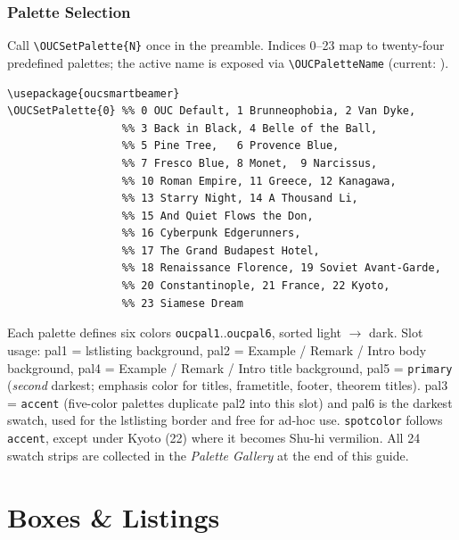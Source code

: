 \documentclass[aspectratio=169,10pt]{beamer}
\begin{document}
\begin{frame}[fragile]
    \frametitle{Palette Selection}
    Call \texttt{\textbackslash OUCSetPalette\{N\}} once in the preamble. Indices 0--23 map to twenty-four predefined palettes; the active name is exposed via \texttt{\textbackslash OUCPaletteName} (current: \OUCPaletteName).
    \begin{lstlisting}[language={[LaTeX]TeX}]
\usepackage{oucsmartbeamer}
\OUCSetPalette{0} %% 0 OUC Default, 1 Brunneophobia, 2 Van Dyke,
                  %% 3 Back in Black, 4 Belle of the Ball,
                  %% 5 Pine Tree,   6 Provence Blue,
                  %% 7 Fresco Blue, 8 Monet,  9 Narcissus,
                  %% 10 Roman Empire, 11 Greece, 12 Kanagawa,
                  %% 13 Starry Night, 14 A Thousand Li,
                  %% 15 And Quiet Flows the Don,
                  %% 16 Cyberpunk Edgerunners,
                  %% 17 The Grand Budapest Hotel,
                  %% 18 Renaissance Florence, 19 Soviet Avant-Garde,
                  %% 20 Constantinople, 21 France, 22 Kyoto,
                  %% 23 Siamese Dream
    \end{lstlisting}
    \begin{infobox}
        Each palette defines six colors \texttt{oucpal1}..\texttt{oucpal6}, sorted light $\rightarrow$ dark. Slot usage: pal1 = lstlisting background, pal2 = Example / Remark / Intro body background, pal4 = Example / Remark / Intro title background, pal5 = \texttt{primary} (\emph{second} darkest; emphasis color for titles, frametitle, footer, theorem titles). pal3 = \texttt{accent} (five-color palettes duplicate pal2 into this slot) and pal6 is the darkest swatch, used for the lstlisting border and free for ad-hoc use. \texttt{spotcolor} follows \texttt{accent}, except under Kyoto (22) where it becomes Shu-hi vermilion. All 24 swatch strips are collected in the \emph{Palette Gallery} at the end of this guide.
    \end{infobox}
\end{frame}

\section{Boxes \& Listings}
\end{document}
